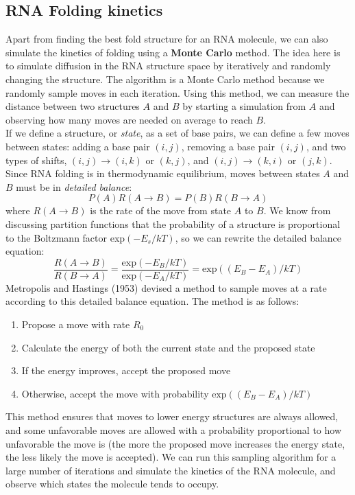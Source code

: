 \documentclass[12pt]{article}
\begin{document}
\subsection{RNA Folding kinetics}
Apart from finding the best fold structure for an RNA molecule, we can also simulate the kinetics of folding using a \textbf{Monte Carlo} method. The idea here is to simulate diffusion in the RNA structure space by iteratively and randomly changing the structure. The algorithm is a Monte Carlo method because we randomly sample moves in each iteration. Using this method, we can measure the distance between two structures $A$ and $B$ by starting a simulation from $A$ and observing how many moves are needed on average to reach $B$.\\[10pt]
If we define a structure, or \textit{state}, as a set of base pairs, we can define a few moves between states: adding a base pair $(i,j)$, removing a base pair $(i,j)$, and two types of shifts, $(i,j)\rightarrow(i,k)\text{ or }(k,j)$, and $(i,j)\rightarrow(k,i)\text{ or }(j,k)$.\\[10pt]
Since RNA folding is in thermodynamic equilibrium, moves between states $A$ and $B$ must be in \textit{detailed balance}:
$$P(A)R(A\rightarrow B) = P(B)R(B\rightarrow A)$$
where $R(A\rightarrow B)$ is the rate of the move from state $A$ to $B$. We know from discussing partition functions that the probability of a structure is proportional to the Boltzmann factor exp$(-E_s/kT)$, so we can rewrite the detailed balance equation:
$$\frac{R(A\rightarrow B)}{R(B\rightarrow A)} = \frac{\text{exp}(-E_B/kT)}{\text{exp}(-E_A/kT)} = \text{exp}((E_B - E_A) / kT)$$
Metropolis and Hastings (1953) devised a method to sample moves at a rate according to this detailed balance equation. The method is as follows:
\begin{enumerate}
    \item Propose a move with rate $R_0$
    \item Calculate the energy of both the current state and the proposed state
    \item If the energy improves, accept the proposed move
    \item Otherwise, accept the move with probability $\text{exp}((E_B - E_A) / kT)$
\end{enumerate}
This method ensures that moves to lower energy structures are always allowed, and some unfavorable moves are allowed with a probability proportional to how unfavorable the move is (the more the proposed move increases the energy state, the less likely the move is accepted). We can run this sampling algorithm for a large number of iterations and simulate the kinetics of the RNA molecule, and observe which states the molecule tends to occupy.
\end{document}
